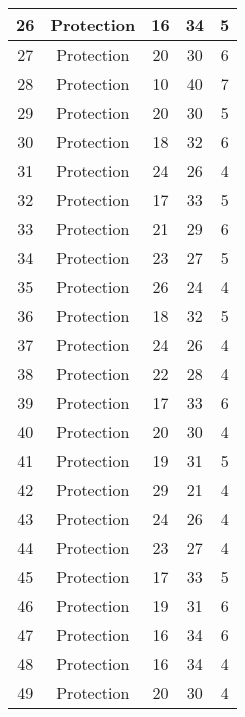 \documentclass[results.tex]{subfiles}
\begin{document}
\begin{center}
\begin{tabular}{| c || c | c | c | c |}
    \hline
    26 & Protection & 16 & 34 & 5 \\ 
    \hline
    27 & Protection & 20 & 30 & 6 \\ 
    \hline
    28 & Protection & 10 & 40 & 7 \\ 
    \hline
    29 & Protection & 20 & 30 & 5 \\ 
    \hline
    30 & Protection & 18 & 32 & 6 \\ 
    \hline
    31 & Protection & 24 & 26 & 4 \\ 
    \hline
    32 & Protection & 17 & 33 & 5 \\ 
    \hline
    33 & Protection & 21 & 29 & 6 \\ 
    \hline
    34 & Protection & 23 & 27 & 5 \\ 
    \hline
    35 & Protection & 26 & 24 & 4 \\ 
    \hline
    36 & Protection & 18 & 32 & 5 \\ 
    \hline
    37 & Protection & 24 & 26 & 4 \\ 
    \hline
    38 & Protection & 22 & 28 & 4 \\ 
    \hline
    39 & Protection & 17 & 33 & 6 \\ 
    \hline
    40 & Protection & 20 & 30 & 4 \\ 
    \hline
    41 & Protection & 19 & 31 & 5 \\ 
    \hline
    42 & Protection & 29 & 21 & 4 \\ 
    \hline
    43 & Protection & 24 & 26 & 4 \\ 
    \hline
    44 & Protection & 23 & 27 & 4 \\ 
    \hline
    45 & Protection & 17 & 33 & 5 \\ 
    \hline
    46 & Protection & 19 & 31 & 6 \\ 
    \hline
    47 & Protection & 16 & 34 & 6 \\ 
    \hline
    48 & Protection & 16 & 34 & 4 \\ 
    \hline
    49 & Protection & 20 & 30 & 4 \\ 
    \hline   \end{tabular}
\end{center}
\end{document}
